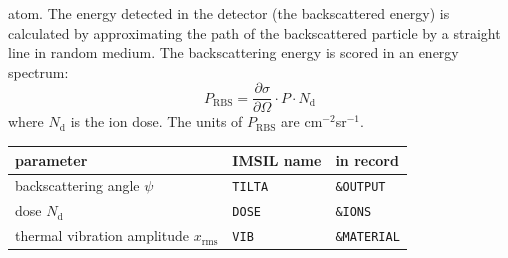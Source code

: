 atom.  The energy detected in the detector (the backscattered energy) is
calculated by approximating the path of the backscattered particle by a
straight line in random medium.  The backscattering energy is scored in an
energy spectrum:
%
\begin{equation}
  P_\mathrm{RBS} = \frac{\partial \sigma}{\partial \Omega} \cdot P \cdot
  N_\mathrm{d}
  \label{rbs:eq4}
\end{equation}
%
where $N_\mathrm{d}$ is the ion dose. The units of \texttt{$P_\mathrm{RBS}$} are
cm$^{-2}$sr$^{-1}$.
%
\begin{center}
\begin{tabular}{lll}
   parameter \quad              & IMSIL name    & in record \\
   \hline
   backscattering angle $\psi$  & {\tt TILTA}   & {\tt \&OUTPUT}   \\
   dose $N_\mathrm{d}$          & {\tt DOSE}    & {\tt \&IONS}     \\
   thermal vibration amplitude $x_\mathrm{rms}$ & {\tt VIB}    
                                                & {\tt \&MATERIAL} \\
\end{tabular}
\end{center}
